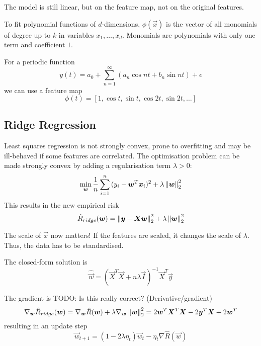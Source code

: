 The model is still linear,
but on the feature map,
not on the original features.

To fit polynomial functions of $d$-dimensions,
$\phi(\vec{x})$ is the vector of all monomials of degree
up to $k$ in variables $x_1, \dotsc, x_d$.
Monomials are polynomials with only one term and coefficient $1$.

For a periodic function
\begin{equation*}
    y(t) = a_0 +
    \sum_{n=1}^\infty{(a_n \cos{nt} + b_n \sin{nt})} + \epsilon
\end{equation*}
we can use a feature map
\begin{equation*}
    \phi(t) = [1, \cos{t}, \sin{t}, \cos{2t}, \sin{2t}, \dotsc]
\end{equation*}


\subsection{Ridge Regression}
Least squares regression is not strongly convex,
prone to overfitting and may be ill-behaved if
some features are correlated.
The optimisation problem can be made strongly convex by adding
a regularisation term $\lambda > 0$:
\begin{equation*}
    \min_{\boldsymbol{w}}{\frac{1}{n}
        \sum_{i=1}^n{(y_i - \boldsymbol{w}^T \boldsymbol{x}_i)^2
            + \lambda \left\lVert\boldsymbol{w}\right\rVert_2^2
    }}
\end{equation*}
This results in the new empirical risk
\begin{equation*}
    \hat{R}_{ridge}(\boldsymbol{w})
    = \left\lVert\boldsymbol{y} - \boldsymbol{X}\boldsymbol{w}\right\rVert_2^2
        + \lambda \left\lVert\boldsymbol{w}\right\rVert_2^2
\end{equation*}

The scale of $\vec{x}$ now matters!
If the features are scaled, it changes the scale of $\lambda$.
Thus, the data has to be standardised.

The closed-form solution is
\begin{equation*}
    \hat{\vec{w}} =
    (\vec{X}^T \vec{X} + n \lambda \vec{I})^{-1} \vec{X}^T \vec{y}
\end{equation*}

The gradient is
TODO: Is this really correct? (Derivative/gradient)
\begin{equation*}
    \nabla_{\boldsymbol{w}} \hat{R}_{ridge}(\boldsymbol{w})
    = \nabla_{\boldsymbol{w}} \hat{R}(\boldsymbol{w})
        + \lambda \nabla_{\boldsymbol{w}} \left\lVert\boldsymbol{w}\right\rVert_2^2
    = 2 \boldsymbol{w}^T \boldsymbol{X}^T \boldsymbol{X} - 2 \boldsymbol{y}^T \boldsymbol{X} + 2 \boldsymbol{w}^T
\end{equation*}
resulting in an update step
\begin{equation*}
    \vec{w}_{t+1} =
    (1 - 2\lambda \eta_t)\vec{w}_t - \eta_t \nabla \hat{R}(\vec{w})
\end{equation*}

